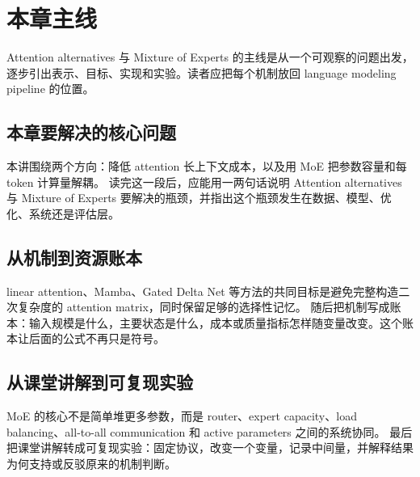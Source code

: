 \documentclass[a4paper]{article}
\begin{document}
\section{本章主线}
Attention alternatives 与 Mixture of Experts 的主线是从一个可观察的问题出发，逐步引出表示、目标、实现和实验。读者应把每个机制放回 language modeling pipeline 的位置。
\subsection{本章要解决的核心问题}
本讲围绕两个方向：降低 attention 长上下文成本，以及用 MoE 把参数容量和每 token 计算量解耦。
读完这一段后，应能用一两句话说明 Attention alternatives 与 Mixture of Experts 要解决的瓶颈，并指出这个瓶颈发生在数据、模型、优化、系统还是评估层。
\subsection{从机制到资源账本}
linear attention、Mamba、Gated Delta Net 等方法的共同目标是避免完整构造二次复杂度的 attention matrix，同时保留足够的选择性记忆。
随后把机制写成账本：输入规模是什么，主要状态是什么，成本或质量指标怎样随变量改变。这个账本让后面的公式不再只是符号。
\subsection{从课堂讲解到可复现实验}
MoE 的核心不是简单堆更多参数，而是 router、expert capacity、load balancing、all-to-all communication 和 active parameters 之间的系统协同。
最后把课堂讲解转成可复现实验：固定协议，改变一个变量，记录中间量，并解释结果为何支持或反驳原来的机制判断。
\end{document}
